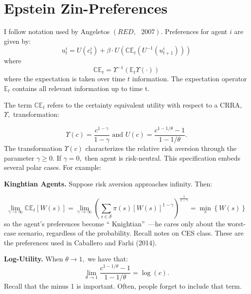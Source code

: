 \documentclass{article}
\begin{document}
\section{Epstein Zin-Preferences}

I follow notation used by Angeletos $\left( RED,\text{ }2007\right) $.
Preferences for agent $i$ are given by:%
\begin{equation*}
u_{t}^{i}=U\left( c_{t}^{i}\right) +\beta \cdot U\left( \mathbb{CE}%
_{t}\left( U^{-1}\left( u_{t+1}^{i}\right) \right) \right)
\end{equation*}%
where
\begin{equation}
\mathbb{CE}_{t}\mathcal{=}\Upsilon ^{-1}\left( \mathbb{E}_{t}\Upsilon \left(
\cdot \right) \right)  \label{1}
\end{equation}%
where the expectation is taken over time $t$ information. The expectation
operator $\mathbb{E}_{t}$ contains all relevant information up to time t.

The term $\mathbb{CE}_{t}$ refers to the certainty equivalent utility with
respect to a CRRA, $\Upsilon ,$ transformation:

\begin{equation*}
\Upsilon \left( c\right) =\frac{c^{1-\gamma }}{1-\gamma }\text{ and }U\left(
c\right) =\frac{c^{1-1/\theta }-1}{1-1/\theta }.
\end{equation*}%
The transformation $\Upsilon \left( c\right) $ characterizes the relative
risk aversion through the parameter $\gamma \geq 0$. If $\gamma =0,$ then
agent is risk-neutral. This specification embeds several polar cases. For
example:

\textbf{Kinghtian Agents.} Suppose risk aversion approaches infinity. Then:

\begin{equation*}
\lim_{\gamma \rightarrow \infty }\mathbb{CE}_{t}\left[ W\left( s\right) %
\right] =\lim_{\gamma \rightarrow \infty }\left( \sum_{s\in \mathcal{S}}\pi
\left( s\right) \left[ W\left( s\right) \right] ^{1-\gamma }\right) ^{\frac{1%
}{1-\gamma }}=\min_{s}\left\{ W\left( s\right) \right\}
\end{equation*}%
so the agent's preferences become \textquotedblleft
Knightian\textquotedblright\ ---he cares only about the worst-case scenario,
regardless of the probability. Recall notes on CES class. These are the
preferences used in Caballero and Farhi (2014).

\textbf{Log-Utility. }When $\theta \rightarrow 1,$ we have that:
\begin{equation*}
\lim_{\theta \rightarrow 1}\frac{c^{1-1/\theta }-1}{1-1/\theta }=\log \left(
c\right) .
\end{equation*}%
Recall that the minus 1 is important. Often, people forget to include that
term.
\end{document}
